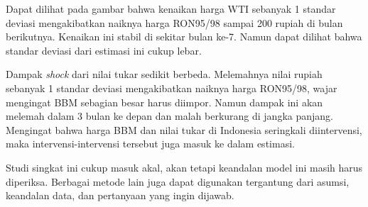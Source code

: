 \documentclass[
  a4paper,
  DIV=11,
  numbers=noendperiod]{scrreprt}
\begin{document}
Dapat dilihat pada gambar bahwa kenaikan harga WTI sebanyak 1 standar
deviasi mengakibatkan naiknya harga RON95/98 sampai 200 rupiah di bulan
berikutnya. Kenaikan ini stabil di sekitar bulan ke-7. Namun dapat
dilihat bahwa standar deviasi dari estimasi ini cukup lebar.

Dampak \emph{shock} dari nilai tukar sedikit berbeda. Melemahnya nilai
rupiah sebanyak 1 standar deviasi mengakibatkan naiknya harga RON95/98,
wajar mengingat BBM sebagian besar harus diimpor. Namun dampak ini akan
melemah dalam 3 bulan ke depan dan malah berkurang di jangka panjang.
Mengingat bahwa harga BBM dan nilai tukar di Indonesia seringkali
diintervensi, maka intervensi-intervensi tersebut juga masuk ke dalam
estimasi.

Studi singkat ini cukup masuk akal, akan tetapi keandalan model ini
masih harus diperiksa. Berbagai metode lain juga dapat digunakan
tergantung dari asumsi, keandalan data, dan pertanyaan yang ingin
dijawab.
\end{document}
